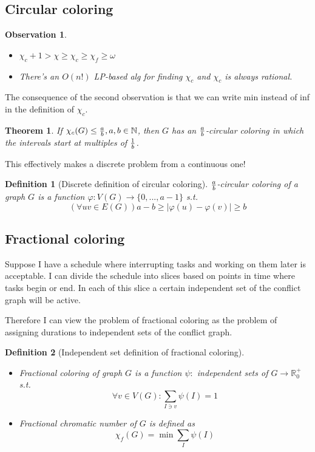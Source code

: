 \documentclass{article}
\newtheorem*{theorem}{Theorem}
\newtheorem*{definition}{Definition}
\newtheorem*{observation}{Observation}
\begin{document}
\subsection*{Circular coloring}

\begin{observation}
	~
	\begin{itemize}
		\item $\chi_c + 1 > \chi \ge \chi_c \ge \chi_f \ge \omega$
		\item There's an $O(n!)$ LP-based alg for finding $\chi_c$ and
			$\chi_c$ is always rational.
	\end{itemize}
\end{observation}

\noindent
The consequence of the second observation is that we can write min instead of
inf in the definition of $\chi_c$.

\begin{theorem}
	If $\chi_c(G) \le {a \over b}, a,b \in \mathbb{N}$, then $G$ has an $a
	\over b$-circular coloring in which the intervals start at multiples of
	$1 \over b$.
\end{theorem}

\noindent
This effectively makes a discrete problem from a continuous one!

\begin{definition}[Discrete definition of circular coloring]
	\emph{$a \over b$-circular coloring} of a graph $G$ is a function
	$\varphi: V(G) \rightarrow \{0, ..., a-1\}$ s.t.
	$$(\forall uv \in E(G)) a - b \ge | \varphi(u) - \varphi(v) | \ge b $$
\end{definition}

\subsection*{Fractional coloring}

Suppose I have a schedule where interrupting tasks and working on them later is
acceptable. I can divide the schedule into slices based on points in time where
tasks begin or end. In each of this slice a certain independent set of the
conflict graph will be active.

Therefore I can view the problem of fractional coloring as the problem of
assigning durations to independent sets of the conflict graph.

\begin{definition}[Independent set definition of fractional coloring]
	~
	\begin{itemize}
		\item \emph{Fractional coloring} of graph $G$ is a function
			$\psi:$ independent sets of $G \rightarrow
			\mathbb{R}_0^+$ s.t.
			$$ \forall v \in V(G): \sum_{I \ni v} \psi(I) = 1 $$
		\item \emph{Fractional chromatic number} of $G$ is defined
			as
			$$ \chi_f(G) = \min \sum_I \psi(I) $$
	\end{itemize}
\end{definition}
\end{document}
